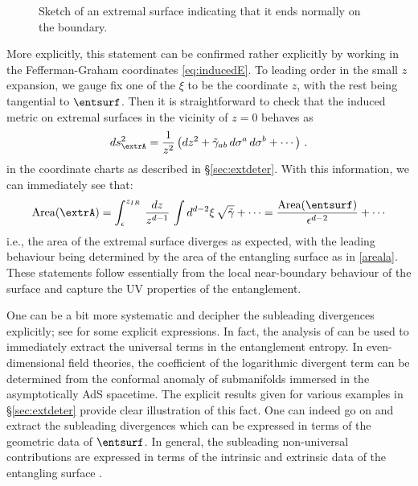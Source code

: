 \documentclass[12pt,openany]{book}
\begin{document}
\begin{figure}[htbp]
\begin{center}
\end{center}
\caption{Sketch of an extremal surface indicating that it ends normally on the boundary. }
\label{f:perpext}
\end{figure}
%

More explicitly, this statement can be confirmed rather explicitly by working in the Fefferman-Graham coordinates
\eqref{eq:inducedE}.  To leading order in the small $z$ expansion, we gauge fix one of the $\xi$ to be the coordinate $z$, with the rest being tangential to $\entsurf$. Then  it is straightforward to check that the induced metric on  extremal surfaces in the vicinity of $z=0$ behaves as
%
\begin{equation}
ds^2_{\extrA} = \frac{1}{z^2} \left(dz^2 + \tilde{\gamma}_{ab}\, d\sigma^a \, d\sigma^b  + \cdots\right) \,.
\label{}
\end{equation}
%
in the  coordinate charts as described in \S\ref{sec:extdeter}. With this information, we can immediately see that:
%
\begin{equation}
\text{Area}(\extrA) = \int_{\epsilon}^{z_{IR}} \, \frac{dz}{z^{d-1}} \,
\int d^{d-2}\xi\, \sqrt{\tilde{\gamma}} + \cdots = \frac{\text{Area}(\entsurf)}{\epsilon^{d-2}} + \cdots
\label{}
\end{equation}
%
i.e., the area of the extremal surface diverges as expected, with the leading behaviour being determined by the area of the entangling surface as in \eqref{areala}. These statements follow essentially from the local near-boundary behaviour of the surface and capture the UV properties of the entanglement.

One can be a bit more systematic and decipher the subleading divergences explicitly; see \cite{Liu:2012eea} for some explicit expressions. In fact, the analysis of \cite{Henningson:1998gx,Graham:1999pm} can be used to immediately extract the universal terms in the entanglement entropy. In even-dimensional field theories, the coefficient of the logarithmic divergent term can be determined from the conformal anomaly of submanifolds immersed in the asymptotically AdS spacetime. The explicit results given for various examples in \S\ref{sec:extdeter} provide clear illustration of this fact. One can indeed go on and extract the subleading divergences which can be expressed in terms of the geometric data of $\entsurf$. In general, the subleading non-universal contributions are expressed  in terms of the intrinsic and extrinsic data of the entangling surface \cite{Solodukhin:2008dh}.
\end{document}

